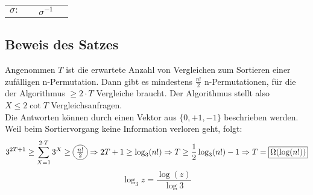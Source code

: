 \begin{center}
\newcommand{\ersterGraph}{
    \begin{tikzpicture}
    \node (1) at (0,0) {1};
    \node (2) at (0,-1) {2};
    \node (3) at (0,-2) {3};
    \node (4) at (2,0) {1};
    \node (5) at (2,-1) {2};
    \node (6) at (2,-2) {3};
    \draw[->] (1) to (6);
    \draw[->] (2) to (4);
    \draw[->] (3) to (5);
    \end{tikzpicture}}
\newcommand{\zweiterGraph}{
    \begin{tikzpicture}
    \node (1) at (0,0) {1};
    \node (2) at (0,-1) {2};
    \node (3) at (0,-2) {3};
    \node (4) at (2,0) {1};
    \node (5) at (2,-1) {2};
    \node (6) at (2,-2) {3};
    \draw[->] (1) to (5);
    \draw[->] (2) to (6);
    \draw[->] (3) to (4);
    \end{tikzpicture}}
    
    \begin{tabular}{cccc}
        $\sigma:$ & \ersterGraph & $\sigma^{-1}$ & \zweiterGraph
    \end{tabular}
\end{center}


\subsection{Beweis des Satzes}
\renewcommand*\circled[1]{\tikz[baseline=(char.base)]{
  \node[shape=circle,draw,inner sep=1pt] (char) {#1};}}
  \renewcommand*\rectangled[1]{\tikz[baseline=(char.base)]{
  \node[shape=rectangle,draw,inner sep=2pt] (char) {#1};}}
Angenommen $T$ ist die erwartete Anzahl von Vergleichen zum Sortieren einer zufälligen n-Permutation. Dann gibt es mindestens $\frac{n!}{2}$ n-Permutationen, für die der Algorithmus $\geq 2 \cdot T$ Vergleiche braucht. Der Algorithmus stellt also $X \leq 2 \cot T$ Vergleichsanfragen.\\
Die Antworten können durch einen Vektor aus $\{0, +1, -1\}$ beschrieben werden. Weil beim Sortiervorgang keine Information verloren geht, folgt:
\[3^{2T + 1} \geq \sum_{X = 1}^{2 \cdot T} 3^X \geq \circled{$\frac{n!}{2}$} \Rightarrow 2T + 1 \geq \log_3(n!) \Rightarrow T \geq \frac{1}{2}\log_3(n!) -1 \Rightarrow T=\rectangled{$\Omega(\log(n!))$}\]
\[\log_3 z = \frac{\log(z)}{\log 3}\]